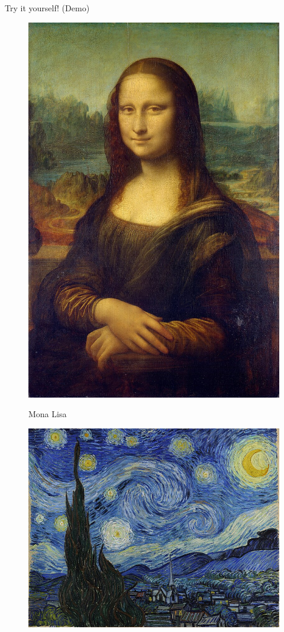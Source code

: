 \documentclass[final]{beamer}
\newlength{\colwidth}
\begin{document}
\begin{frame}{}
\begin{columns}[t]
\begin{column}{\colwidth}
\begin{myblock}{Try it yourself! (Demo)}
    \vspace{1.5cm}
    \begin{figure}
      \centering
        \begin{minipage}{.5\textwidth}
            \centering
            \includegraphics[width=.7\linewidth]{Images/Mona_Lisa.jpg}
            
            Mona Lisa
        \end{minipage}%
        \begin{minipage}{.5\textwidth}
            \centering
            \vspace{4.0cm}
            \includegraphics[width=1.0\linewidth]{Images/Starry_Night.jpg}
            

\end{minipage}
\end{figure}
\end{myblock}
\end{column}
\end{columns}
\end{frame}
\end{document}
